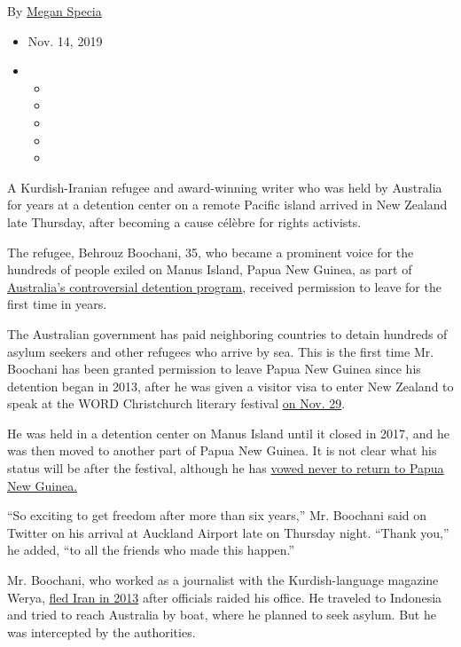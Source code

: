 By \href{https://www.nytimes3xbfgragh.onion/by/megan-specia}{Megan
Specia}

\begin{itemize}
\item
  Nov. 14, 2019
\item
  \begin{itemize}
  \item
  \item
  \item
  \item
  \item
  \end{itemize}
\end{itemize}

A Kurdish-Iranian refugee and award-winning writer who was held by
Australia for years at a detention center on a remote Pacific island
arrived in New Zealand late Thursday, after becoming a cause célèbre for
rights activists.

The refugee, Behrouz Boochani, 35, who became a prominent voice for the
hundreds of people exiled on Manus Island, Papua New Guinea, as part of
\href{https://www.nytimes3xbfgragh.onion/2018/07/21/world/australia/australia-refugee-policy-protest.html}{Australia's
controversial detention program}, received permission to leave for the
first time in years.

The Australian government has paid neighboring countries to detain
hundreds of asylum seekers and other refugees who arrive by sea. This is
the first time Mr. Boochani has been granted permission to leave Papua
New Guinea since his detention began in 2013, after he was given a
visitor visa to enter New Zealand to speak at the WORD Christchurch
literary festival
\href{https://wordchristchurch.co.nz/programme/behrouz-boochani/}{on
Nov. 29}.

He was held in a detention center on Manus Island until it closed in
2017, and he was then moved to another part of Papua New Guinea. It is
not clear what his status will be after the festival, although he has
\href{https://www.theguardian.com/australia-news/2019/nov/14/behrouz-boochani-free-voice-manus-island-refugees-new-zealand-australia}{vowed
never to return to Papua New Guinea.}

``So exciting to get freedom after more than six years,'' Mr. Boochani
said on Twitter on his arrival at Auckland Airport late on Thursday
night. ``Thank you,'' he added, ``to all the friends who made this
happen.''

Mr. Boochani, who worked as a journalist with the Kurdish-language
magazine Werya,
\href{https://www.nytimes3xbfgragh.onion/2017/02/13/insider/manus-island-refugee-australia.html?module=inline}{fled
Iran in 2013} after officials raided his office. He traveled to
Indonesia and tried to reach Australia by boat, where he planned to seek
asylum. But he was intercepted by the authorities.

